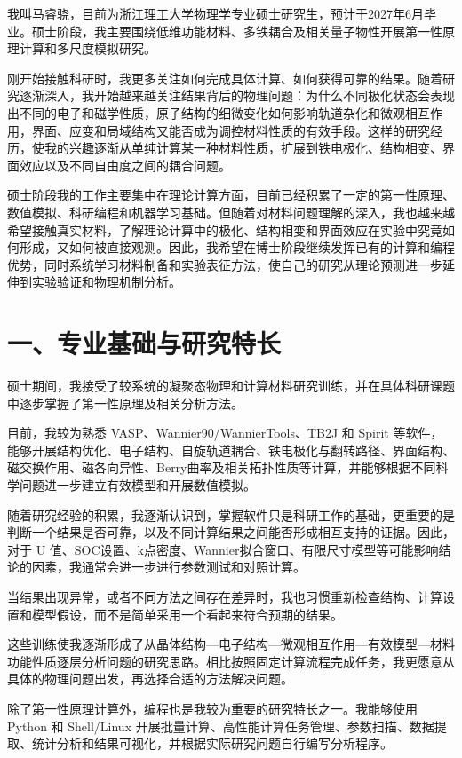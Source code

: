我叫马睿骁，目前为浙江理工大学物理学专业硕士研究生，预计于2027年6月毕业。硕士阶段，我主要围绕低维功能材料、多铁耦合及相关量子物性开展第一性原理计算和多尺度模拟研究。

刚开始接触科研时，我更多关注如何完成具体计算、如何获得可靠的结果。随着研究逐渐深入，我开始越来越关注结果背后的物理问题：为什么不同极化状态会表现出不同的电子和磁学性质，原子结构的细微变化如何影响轨道杂化和微观相互作用，界面、应变和局域结构又能否成为调控材料性质的有效手段。这样的研究经历，使我的兴趣逐渐从单纯计算某一种材料性质，扩展到铁电极化、结构相变、界面效应以及不同自由度之间的耦合问题。

硕士阶段我的工作主要集中在理论计算方面，目前已经积累了一定的第一性原理、数值模拟、科研编程和机器学习基础。但随着对材料问题理解的深入，我也越来越希望接触真实材料，了解理论计算中的极化、结构相变和界面效应在实验中究竟如何形成，又如何被直接观测。因此，我希望在博士阶段继续发挥已有的计算和编程优势，同时系统学习材料制备和实验表征方法，使自己的研究从理论预测进一步延伸到实验验证和物理机制分析。

\section{一、专业基础与研究特长}

硕士期间，我接受了较系统的凝聚态物理和计算材料研究训练，并在具体科研课题中逐步掌握了第一性原理及相关分析方法。

目前，我较为熟悉 VASP、Wannier90/WannierTools、TB2J 和 Spirit 等软件，能够开展结构优化、电子结构、自旋轨道耦合、铁电极化与翻转路径、界面结构、磁交换作用、磁各向异性、Berry曲率及相关拓扑性质等计算，并能够根据不同科学问题进一步建立有效模型和开展数值模拟。

随着研究经验的积累，我逐渐认识到，掌握软件只是科研工作的基础，更重要的是判断一个结果是否可靠，以及不同计算结果之间能否形成相互支持的证据。因此，对于 U 值、SOC设置、k点密度、Wannier拟合窗口、有限尺寸模型等可能影响结论的因素，我通常会进一步进行参数测试和对照计算。

当结果出现异常，或者不同方法之间存在差异时，我也习惯重新检查结构、计算设置和模型假设，而不是简单采用一个看起来符合预期的结果。

这些训练使我逐渐形成了从晶体结构—电子结构—微观相互作用—有效模型—材料功能性质逐层分析问题的研究思路。相比按照固定计算流程完成任务，我更愿意从具体的物理问题出发，再选择合适的方法解决问题。

除了第一性原理计算外，编程也是我较为重要的研究特长之一。我能够使用 Python 和 Shell/Linux 开展批量计算、高性能计算任务管理、参数扫描、数据提取、统计分析和结果可视化，并根据实际研究问题自行编写分析程序。

